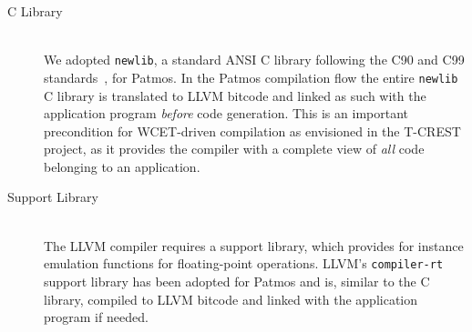 \begin{description}
\item[C Library] \hfill\\
  We adopted \texttt{newlib}, a
  standard ANSI C library following the C90 and C99 
  standards~\cite{ISO:9899:1990,ISO:9899:1999}, for Patmos. In the Patmos 
  compilation flow the entire \texttt{newlib} C library is translated to LLVM 
  bitcode and linked as such with the application program \emph{before} code 
  generation. This is an important precondition for WCET-driven compilation as 
  envisioned in the T-CREST project, as it provides the compiler with a complete 
  view of \emph{all} code belonging to an application.

\item[Support Library] \hfill\\
  The LLVM compiler requires a support library, which provides for instance 
  emulation functions for floating-point operations. LLVM's 
  \texttt{compiler-rt} support
  library has been adopted for Patmos and is, similar to the C library, compiled 
  to LLVM bitcode and linked with the application program if needed.
\end{description}

